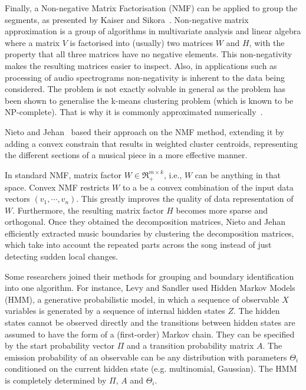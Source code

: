 Finally, a Non-negative Matrix Factorisation (NMF) can be applied to group the segments, as presented by Kaiser and Sikora~\cite{Sikora}. Non-negative matrix approximation is a group of algorithms in multivariate analysis and linear algebra where a matrix $V$ is factorised into (usually) two matrices $W$ and $H$, with the property that all three matrices have no negative elements. This non-negativity makes the resulting matrices easier to inspect. Also, in applications such as processing of audio spectrograms non-negativity is inherent to the data being considered. The problem is not exactly solvable in general as the problem has been shown to generalise the k-means clustering problem (which is known to be NP-complete). That is why it is commonly approximated numerically~\cite{NMFNP}.

Nieto and Jehan~\cite{Nieto} based their approach on the NMF method, extending it by adding a convex constrain that results in weighted cluster centroids, representing the different sections of a musical piece in a more effective manner. 

In standard NMF, matrix factor $W \in \Re^{m \times k}_{+}$, i.e., $W$ can be anything in that space. Convex NMF restricts $W$ to a be a convex combination of the input data vectors  $(v_1, \cdots, v_n)$. This greatly improves the quality of data representation of $W$. Furthermore, the resulting matrix factor $H$ becomes more sparse and orthogonal. Once they obtained the decomposition matrices, Nieto and Jehan efficiently extracted music boundaries by clustering the decomposition matrices, which take into account the repeated parts across the song instead of just detecting sudden local changes.

Some researchers joined their methods for grouping and boundary identification into one algorithm. For instance, Levy and Sandler used Hidden Markov Models (HMM), a generative probabilistic model, in which a sequence of observable $X$ variables is generated by a sequence of internal hidden states $Z$. The hidden states cannot be observed directly and the transitions between hidden states are assumed to have the form of a (first-order) Markov chain. They can be specified by the start probability vector $\Pi$ and a transition probability matrix $A$. The emission probability of an observable can be any distribution with parameters $\Theta_{i}$ conditioned on the current hidden state (e.g. multinomial, Gaussian). The HMM is completely determined by $\Pi$, $A$ and $\Theta_{i}$.

